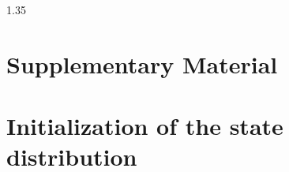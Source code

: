 \documentclass[12pt,a4paper]{article}
\begin{document}
\begin{spacing}{1.35}


\newpage
\section*{Supplementary Material}
\setcounter{section}{0}
\setcounter{page}{1}
\setcounter{table}{0}
\setcounter{figure}{0}
\section{Initialization of the state distribution}


\end{spacing}
\end{document}
